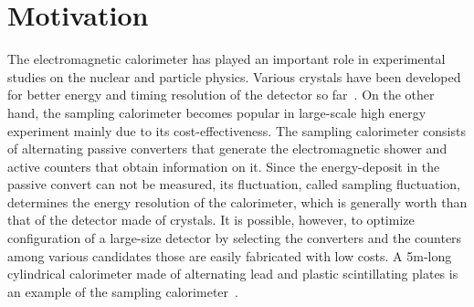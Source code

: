 \documentclass[jkps,preprint,fleqn,showpacs,showkeys]{revtex4}
\begin{document}
\maketitle

\section{Motivation}
\label{sec:mot}
The electromagnetic calorimeter has played an important role in experimental studies on the nuclear and particle physics.  
Various crystals have been developed for better energy and timing resolution of the detector so far~\cite{Calorimeter}. %
On the other hand, the sampling calorimeter becomes popular in large-scale high energy experiment mainly due to its cost-effectiveness. The sampling calorimeter consists of alternating passive converters that generate the electromagnetic shower and active counters that obtain information on it. Since the energy-deposit in the passive convert can not be measured, its fluctuation, called sampling fluctuation, determines the energy resolution of the  calorimeter, which is generally worth than that of the detector made of crystals.
It is possible, however, to optimize configuration of a large-size detector by selecting the converters and the counters among various candidates those are easily fabricated with low costs. A 5m-long cylindrical calorimeter made of alternating lead and plastic scintillating plates is an example of the sampling calorimeter~\cite{E391a_barrel}.

\end{document}
